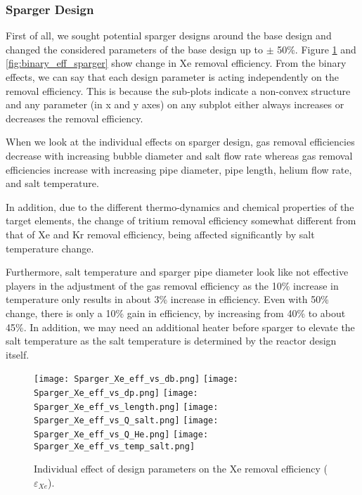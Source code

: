 \begin{itemize}
\subsubsection{Sparger Design}

    First of all, we sought potential sparger designs around the base design 
    and changed the considered parameters of the base design up to $\pm$ 50\%. 
    Figure \ref{fig:individual_eff_sparger} and \ref{fig:binary_eff_sparger} 
    show change in Xe removal efficiency. From the binary effects, we can say 
    that each design parameter is acting independently on the removal 
    efficiency. This is because the sub-plots indicate a non-convex structure 
    and any parameter (in x and y axes) on any subplot either always increases 
    or decreases the removal efficiency.

    When we look at the individual effects on sparger design, gas removal 
    efficiencies decrease with increasing bubble diameter and salt flow rate 
    whereas gas removal efficiencies increase with increasing pipe diameter, 
    pipe length, helium flow rate, and salt temperature.

    In addition, due to the different thermo-dynamics and chemical properties 
    of the target elements, the change of tritium removal efficiency somewhat 
    different from that of Xe and Kr removal efficiency, being affected 
    significantly by salt temperature change.

    Furthermore, salt temperature and sparger pipe diameter look like not 
    effective players in the adjustment of the gas removal efficiency as the 
    10\% increase in temperature only results in about 3\% increase in 
    efficiency. Even with 50\% change, there is only a 10\% gain in efficiency, 
    by increasing from 40\% to about 45\%. In addition, we may need an 
    additional heater before sparger to elevate the salt temperature as the 
    salt temperature is determined by the reactor design itself.

    \begin{figure}[htbp!]
        \begin{center}
            \texttt{[image: Sparger\_Xe\_eff\_vs\_db.png]}
            \texttt{[image: Sparger\_Xe\_eff\_vs\_dp.png]}
            \texttt{[image: Sparger\_Xe\_eff\_vs\_length.png]}
            \texttt{[image: Sparger\_Xe\_eff\_vs\_Q\_salt.png]}
            \texttt{[image: Sparger\_Xe\_eff\_vs\_Q\_He.png]}
            \texttt{[image: Sparger\_Xe\_eff\_vs\_temp\_salt.png]}
        \end{center}
        \caption{Individual effect of design parameters on the Xe removal 
            efficiency ($\varepsilon$$_{Xe}$).}
        \label{fig:individual_eff_sparger}
    \end{figure}


\end{itemize}
